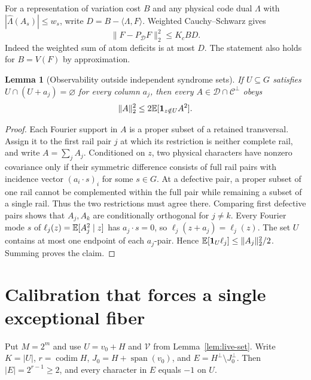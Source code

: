 \documentclass[11pt]{article}
\newtheorem{lemma}[theorem]{Lemma}
\theoremstyle{remark}\newtheorem{remark}[theorem]{Remark}
\newcommand{\one}{\mathbf1}\newcommand{\F}{\mathbb F}
\DeclareMathOperator{\spanop}{span}
\begin{document}
For a representation of variation cost $B$ and any physical code dual
$\Lambda$ with $|\widehat\Lambda(A_s)|\le w_s$, write
$D=B-\langle\Lambda,F\rangle$. Weighted Cauchy--Schwarz gives
\begin{equation}\label{eq:network-stability}
 \|F-P_{\mathcal D}F\|_2^2\le K_cBD.
\end{equation}
Indeed the weighted sum of atom deficits is at most $D$. The statement
also holds for $B=V(F)$ by approximation.

\begin{lemma}[Observability outside independent syndrome sets]
\label{lem:observability}
If $U\subseteq G$ satisfies $U\cap(U+a_j)=\varnothing$ for every
column $a_j$, then every $A\in\mathcal D\cap\mathcal C^\perp$ obeys
\begin{equation}\label{eq:half-observability}
 \|A\|_2^2\le2\E[\one_{z\notin U}A^2].
\end{equation}
\end{lemma}
\begin{proof}
Each Fourier support in $A$ is a proper subset of a retained
transversal. Assign it to the first rail pair $j$ at which its
restriction is neither complete rail, and write $A=\sum_j A_j$.
Conditioned on $z$, two physical characters have nonzero covariance
only if their symmetric difference consists of full rail pairs with
incidence vector $(a_i\cdot s)_i$ for some $s\in G$.
At a defective pair, a proper subset of one rail cannot be complemented
within the full pair while remaining a subset of a single rail. Thus
the two restrictions must agree there. Comparing first defective pairs
shows that $A_j,A_k$ are conditionally orthogonal for $j\ne k$.
Every Fourier mode $s$ of $\ell_j(z)=\mathbb E[A_j^2\mid z]$ has
$a_j\cdot s=0$, so $\ell_j(z+a_j)=\ell_j(z)$.
The set $U$ contains at most one endpoint of each $a_j$-pair. Hence
$\E[\one_U\ell_j]\le\|A_j\|_2^2/2$. Summing proves the claim.
\end{proof}



\section{Calibration that forces a single exceptional fiber}

Put $M=2^m$ and use $U=v_0+H$ and $\mathcal V$ from
Lemma~\ref{lem:live-set}. Write $K=|U|$, $r=\operatorname{codim}H$,
$J_0=H+\spanop(v_0)$, and $E=H^\perp\setminus J_0^\perp$.
Then $|E|=2^{r-1}\ge2$, and every character in $E$ equals $-1$ on $U$.
\end{document}
